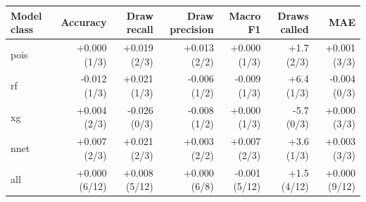 
\begin{tabular}{lrrrrrr}
\toprule
Model class & Accuracy & Draw recall & Draw precision & Macro F1 & Draws called & MAE\\
\midrule
pois & +0.000 (1/3) & +0.019 (2/3) & +0.013 (2/2) & +0.000 (1/3) & +1.7 (2/3) & +0.001 (3/3)\\
rf & -0.012 (1/3) & +0.021 (1/3) & -0.006 (1/2) & -0.009 (1/3) & +6.4 (1/3) & -0.004 (0/3)\\
xg & +0.004 (2/3) & -0.026 (0/3) & -0.008 (1/2) & +0.000 (1/3) & -5.7 (0/3) & +0.000 (3/3)\\
nnet & +0.007 (2/3) & +0.021 (2/3) & +0.003 (2/2) & +0.007 (2/3) & +3.6 (1/3) & +0.003 (3/3)\\
all & +0.000 (6/12) & +0.008 (5/12) & +0.000 (6/8) & -0.001 (5/12) & +1.5 (4/12) & +0.000 (9/12)\\
\bottomrule
\end{tabular}
